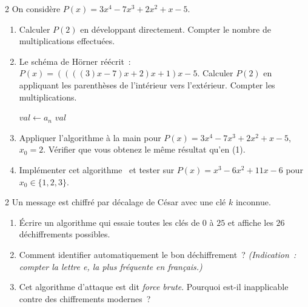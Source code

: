 \begin{probleme}{2}
On consid\`ere $P(x) = 3x^4 - 7x^3 + 2x^2 + x - 5$.
\begin{enumerate}
  \item Calculer $P(2)$ en d\'eveloppant directement.
        Compter le nombre de multiplications effectu\'ees.
  \item Le sch\'ema de H\"orner r\'e\'ecrit~:
        $P(x) = ((((3)x - 7)x + 2)x + 1)x - 5.$
        Calculer $P(2)$ en appliquant les parenth\`eses de l'int\'erieur
        vers l'ext\'erieur. Compter les multiplications.

\begin{algorithm}[H]
\caption{Sch\'ema de H\"orner pour $P(x_0) = a_n x^n + \cdots + a_0$}
$\mathit{val} \leftarrow a_n$\;
\Afficher $\mathit{val}$\;
\end{algorithm}

  \item Appliquer l'algorithme \`a la main pour $P(x)=3x^4-7x^3+2x^2+x-5$,
        $x_0=2$. V\'erifier que vous obtenez le m\^eme r\'esultat qu'en (1).
  \item Impl\'ementer cet algorithme \computer\ et tester sur
        $P(x) = x^3 - 6x^2 + 11x - 6$ pour $x_0 \in \{1,2,3\}$.
\end{enumerate}
\end{probleme}

\begin{probleme}{2}
Un message est chiffr\'e par d\'ecalage de C\'esar avec une cl\'e $k$ inconnue.
\begin{enumerate}
  \item \'Ecrire un algorithme qui essaie toutes les cl\'es de $0$ \`a $25$
        et affiche les $26$ d\'echiffrements possibles.
  \item Comment identifier automatiquement le bon d\'echiffrement~?
        \emph{(Indication~: compter la lettre \og e\fg, la plus fr\'equente
        en fran\c cais.)}
  \item Cet algorithme d'attaque est dit \emph{force brute}. Pourquoi
        est-il inapplicable contre des chiffrements modernes~?
\end{enumerate}
\end{probleme}


